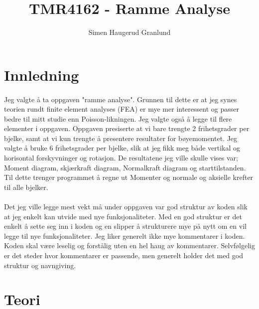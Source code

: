 \documentclass[10pt,a4paper, norsk]{article}
\author{Simen Haugerud Granlund}
\title{TMR4162 - Ramme Analyse}
\begin{document}
\maketitle
\lstset{language=C++,basicstyle=\footnotesize} %
\maketitle
\thispagestyle{empty} 	%
\newpage %

\section*{Innledning}
\paragraph*{}
Jeg valgte å ta oppgaven "ramme analyse". Grunnen til dette er at jeg synes teorien rundt finite element analyses (FEA) er mye mer interessent og passer bedre til mitt studie enn Poisson-likningen. Jeg valgte også å legge til flere elementer i oppgaven. Oppgaven presiserte at vi bare trengte 2 frihetsgrader per bjelke, samt at vi kun trengte å presentere resultater for bøyemomentet. Jeg valgte å bruke 6 frihetsgrader per bjelke, slik at jeg fikk meg både  vertikal og horisontal forskyvninger og rotasjon. De resultatene jeg ville skulle vises var; Moment diagram, skjærkraft diagram, Normalkraft diagram og starttilstanden. Til dette trenger programmet å regne ut Momenter og normale og aksielle krefter til alle bjelker.

\paragraph*{}
Det jeg ville legge mest vekt må under oppgaven var god struktur av koden slik at jeg enkelt kan utvide med nye funksjonaliteter. Med en god struktur er det enkelt å sette seg inn i koden og en slipper å strukturere mye på nytt om en vil legge til nye funksjonaliteter. Jeg liker generelt ikke mye kommentarer i koden. Koden skal være leselig og forstålig uten en hel haug av kommentarer. Selvfølgelig er det steder hvor kommentarer er passende, men generelt holder det med god struktur og navngiving.


\section*{Teori}
\end{document}
